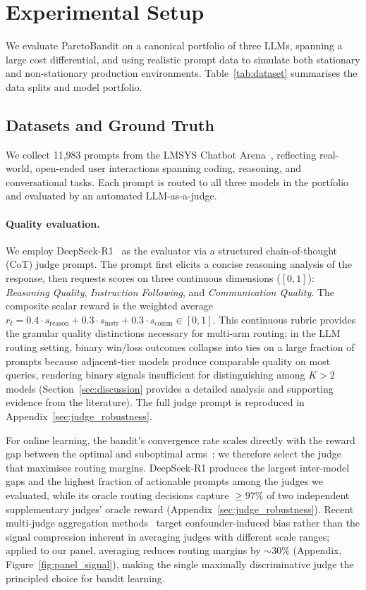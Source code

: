 \section{Experimental Setup}
\label{sec:setup}

We evaluate ParetoBandit on a canonical portfolio of three LLMs, spanning a large cost differential, and using realistic prompt data to simulate both stationary and non-stationary production environments.  Table~\ref{tab:dataset} summarises the data splits and model portfolio.

\subsection{Datasets and Ground Truth}

We collect 11,983 prompts from the LMSYS Chatbot Arena~\cite{zheng2023judging}, reflecting real-world, open-ended user interactions spanning coding, reasoning, and conversational tasks.  Each prompt is routed to all three models in the portfolio and evaluated by an automated LLM-as-a-judge.

\paragraph{Quality evaluation.}
We employ DeepSeek-R1~\cite{deepseekai2025deepseekr1} as the evaluator via a structured chain-of-thought (CoT) judge prompt.  The prompt first elicits a concise reasoning analysis of the response, then requests scores on three continuous dimensions ($[0,1]$): \emph{Reasoning Quality}, \emph{Instruction Following}, and \emph{Communication Quality}.  The composite scalar reward is the weighted average $r_t = 0.4 \cdot s_{\text{reason}} + 0.3 \cdot s_{\text{instr}} + 0.3 \cdot s_{\text{comm}} \in [0, 1]$.  This continuous rubric provides the granular quality distinctions necessary for multi-arm routing; in the LLM routing setting, binary win/loss outcomes collapse into ties on a large fraction of prompts because adjacent-tier models produce comparable quality on most queries, rendering binary signals insufficient for distinguishing among $K > 2$ models (Section~\ref{sec:discussion} provides a detailed analysis and supporting evidence from the literature).  The full judge prompt is reproduced in Appendix~\ref{sec:judge_robustness}.

For online learning, the bandit's convergence rate scales directly with the reward gap between the optimal and suboptimal arms~\cite{lattimore2020bandit}; we therefore select the judge that maximises routing margins.  DeepSeek-R1 produces the largest inter-model gaps and the highest fraction of actionable prompts among the judges we evaluated, while its oracle routing decisions capture $\geq 97\%$ of two independent supplementary judges' oracle reward (Appendix~\ref{sec:judge_robustness}).  Recent multi-judge aggregation methods~\cite{verga2024poll,zhao2025care} target confounder-induced bias rather than the signal compression inherent in averaging judges with different scale ranges; applied to our panel, averaging reduces routing margins by ${\sim}30\%$ (Appendix, Figure~\ref{fig:panel_signal}), making the single maximally discriminative judge the principled choice for bandit learning.

